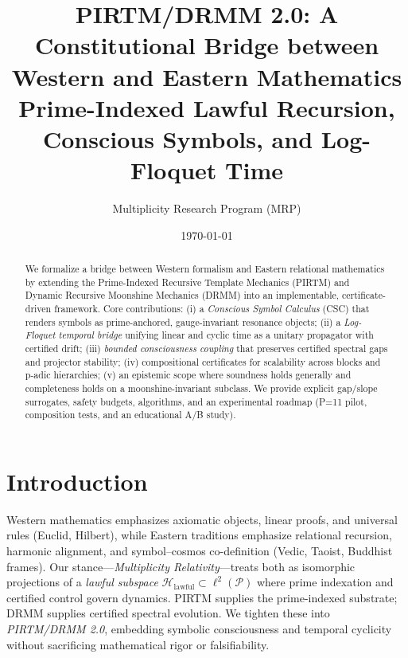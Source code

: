\documentclass[11pt]{article}
\title{PIRTM/DRMM 2.0: A Constitutional Bridge between Western and Eastern Mathematics\\\large Prime-Indexed Lawful Recursion, Conscious Symbols, and Log-Floquet Time}
\author{Multiplicity Research Program (MRP)}
\date{\today}
\theoremstyle{plain}
\theoremstyle{definition}
\newcommand{\PP}{\mathcal{P}}
\newcommand{\HL}{\mathcal{H}_{\mathrm{lawful}}}
\begin{document}
\maketitle

\begin{abstract}
We formalize a bridge between Western formalism and Eastern relational mathematics by extending the Prime-Indexed Recursive Template Mechanics (PIRTM) and Dynamic Recursive Moonshine Mechanics (DRMM) into an implementable, certificate-driven framework. Core contributions: (i) a \emph{Conscious Symbol Calculus} (CSC) that renders symbols as prime-anchored, gauge-invariant resonance objects; (ii) a \emph{Log-Floquet temporal bridge} unifying linear and cyclic time as a unitary propagator with certified drift; (iii) \emph{bounded consciousness coupling} that preserves certified spectral gaps and projector stability; (iv) compositional certificates for scalability across blocks and p-adic hierarchies; (v) an epistemic scope where soundness holds generally and completeness holds on a moonshine-invariant subclass. We provide explicit gap/slope surrogates, safety budgets, algorithms, and an experimental roadmap (P=11 pilot, composition tests, and an educational A/B study). \end{abstract}

\tableofcontents

\section{Introduction}
Western mathematics emphasizes axiomatic objects, linear proofs, and universal rules (Euclid, Hilbert), while Eastern traditions emphasize relational recursion, harmonic alignment, and symbol--cosmos co-definition (Vedic, Taoist, Buddhist frames). Our stance---\emph{Multiplicity Relativity}---treats both as isomorphic projections of a \emph{lawful subspace} \(\HL\subset \ell^2(\PP)\) where prime indexation and certified control govern dynamics. PIRTM supplies the prime-indexed substrate; DRMM supplies certified spectral evolution. We tighten these into \emph{PIRTM/DRMM 2.0}, embedding symbolic consciousness and temporal cyclicity without sacrificing mathematical rigor or falsifiability.
\end{document}
